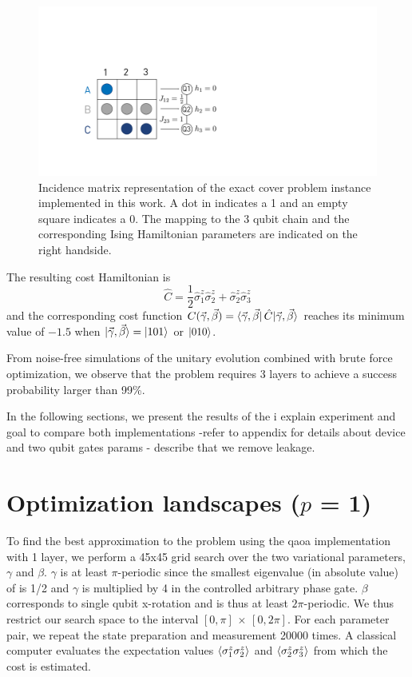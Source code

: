 \begin{figure}[ht]
    \centering
    \includegraphics[width=\textwidth, trim={11cm 8cm 38cm 10cm},clip]{chapters/qaoa/figs/exact_cover_matrix.pdf}
    \caption{Incidence matrix representation of the exact cover problem instance implemented in this work. A dot in indicates a 1 and an empty square indicates a 0. The mapping to the 3 qubit chain and the corresponding Ising Hamiltonian parameters are indicated on the right handside.}
    \label{fig:qaoa_exact_cover_matrix}
\end{figure}

The resulting cost Hamiltonian is
\begin{equation}
    \hat C = \frac{1}{2}\hat\sigma_1^z\hat\sigma_2^z + \hat\sigma_2^z\hat\sigma_3^z
\end{equation}
and the corresponding cost function $C(\vec\gamma, \vec\beta) = \bra{\vec\gamma, \vec\beta} \hat C |\vec{\gamma}, \vec{\beta}\rangle{}$ reaches its minimum value of $-1.5$ when $|\vec{\gamma}, \vec{\beta}\rangle{} = \ket{101}$ or $\ket{010}$. 

From noise-free simulations of the unitary evolution combined with brute force optimization, we observe that the problem requires 3 layers to achieve a success probability larger than 99\%.

In the following sections, we present the results of the i
explain experiment and goal to compare both implementations
-refer to appendix for details about device and two qubit gates params
- describe that we remove leakage.


\section{Optimization landscapes ($p$ = 1)}
To find the best approximation to the problem using the \gls{qaoa} implementation with 1 layer, we perform a 45x45 grid search over the two variational parameters, $\gamma$ and $\beta$. $\gamma$ is at least $\pi$-periodic since the smallest eigenvalue (in absolute value) of \costh{} is 1/2 and $\gamma$ is multiplied by 4 in the controlled arbitrary phase gate. $\beta$ corresponds to single qubit x-rotation and is thus at least $2\pi$-periodic.  We thus restrict our search space to the interval $[0, \pi] \,\times\, [0, 2\pi]$. For each parameter pair, we repeat the state preparation and measurement 20000 times. A classical computer evaluates the expectation values $\langle\sigma_{1}^z \sigma_{2}^z\rangle$ and $\langle \sigma_{2}^z \sigma_{3}^z \rangle$ from which the cost \cost{} is estimated.

